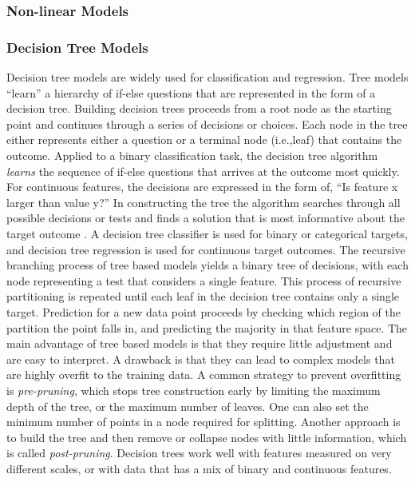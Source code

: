 \documentclass[sigconf]{acmart}
\begin{document}
\subsubsection{Non-linear Models}











\subsubsection{Decision Tree Models}

Decision tree models are widely used for classification and regression. Tree 
models ``learn'' a hierarchy of if-else questions that are represented in the
form of a decision tree. Building decision trees proceeds from a root node as 
the starting point and continues through a series of decisions or choices.
Each node in the tree either represents either a question or a terminal node 
(i.e.,leaf) that contains the outcome. Applied to a binary classification task, 
the decision tree algorithm \emph{learns} the sequence of if-else questions 
that arrives at the outcome most quickly. For continuous features, the 
decisions are expressed in the form of, ``Is feature x larger than value y?''
 In constructing the tree the algorithm searches through all
possible decisions or tests and finds a solution that is most informative 
about the target outcome \cite{muller17}. A decision tree classifier is used 
for binary or categorical targets, and decision tree regression is used for 
continuous target outcomes. The recursive branching process of tree based 
models yields a binary tree of decisions, with each node representing a test 
that considers a single feature. This process of recursive partitioning is 
repeated until each leaf in the decision tree contains only a single target. 
Prediction for a new data point proceeds by checking which region of the 
partition the point falls in, and predicting the majority in that feature space. 
The main advantage of tree based models is that they require little adjustment 
and are easy to interpret. A drawback is that they can lead to complex models 
that are highly overfit to the training data. A common strategy to prevent 
overfitting is \emph{pre-pruning}, which stops tree construction early by 
limiting the maximum depth of the tree, or the maximum number of leaves. 
One can also set the minimum number of points in a node required for splitting. 
Another approach is to build the tree and then remove or collapse nodes with 
little information, which is called \emph{post-pruning}. Decision trees work 
well with features measured on very different scales, or with data that has 
a mix of binary and continuous features. 
\end{document}

